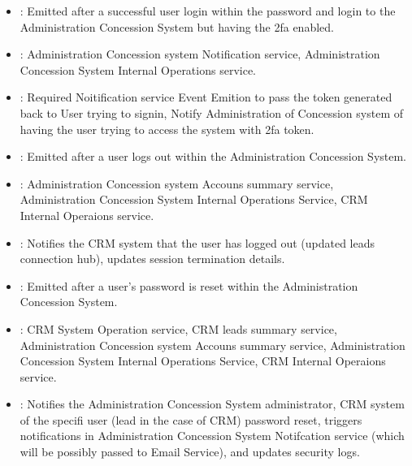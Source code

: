 \documentclass[letterpaper,10pt,english]{sphinxmanual}
\begin{document}
\sphinxAtStartPar
{}
\begin{itemize}
\item {} 
\sphinxAtStartPar
{}: Emitted after a successful user login within the password and login to  the Administration Concession System but having the 2fa enabled.

\item {} 
\sphinxAtStartPar
{}: Administration Concession system Notification service, Administration Concession System Internal Operations service.

\item {} 
\sphinxAtStartPar
{}: Required Noitification service Event Emition to pass the token generated back to User trying to sign\sphinxhyphen{}in, Notify Administration of Concession system of having the user trying to access the system with 2fa token.

\end{itemize}

\sphinxAtStartPar
{}
\begin{itemize}
\item {} 
\sphinxAtStartPar
{}: Emitted after a user logs out within the Administration Concession System.

\item {} 
\sphinxAtStartPar
{}: Administration Concession system Accouns summary service, Administration Concession System Internal Operations Service, CRM Internal Operaions service.

\item {} 
\sphinxAtStartPar
{}: Notifies the CRM system that the user has logged out (updated leads connection hub), updates session termination details.

\end{itemize}

\sphinxAtStartPar
{}
\begin{itemize}
\item {} 
\sphinxAtStartPar
{}: Emitted after a user’s password is reset within the Administration Concession System.

\item {} 
\sphinxAtStartPar
{}: CRM System Operation service, CRM leads summary service,  Administration Concession system Accouns summary service, Administration Concession System Internal Operations Service, CRM Internal Operaions service.

\item {} 
\sphinxAtStartPar
{}: Notifies the Administration Concession System administrator, CRM system of the specifi user (lead in the case of CRM) password reset, triggers notifications in Administration Concession System Notifcation service (which will be possibly passed to Email Service), and updates security logs.

\end{itemize}
\end{document}
